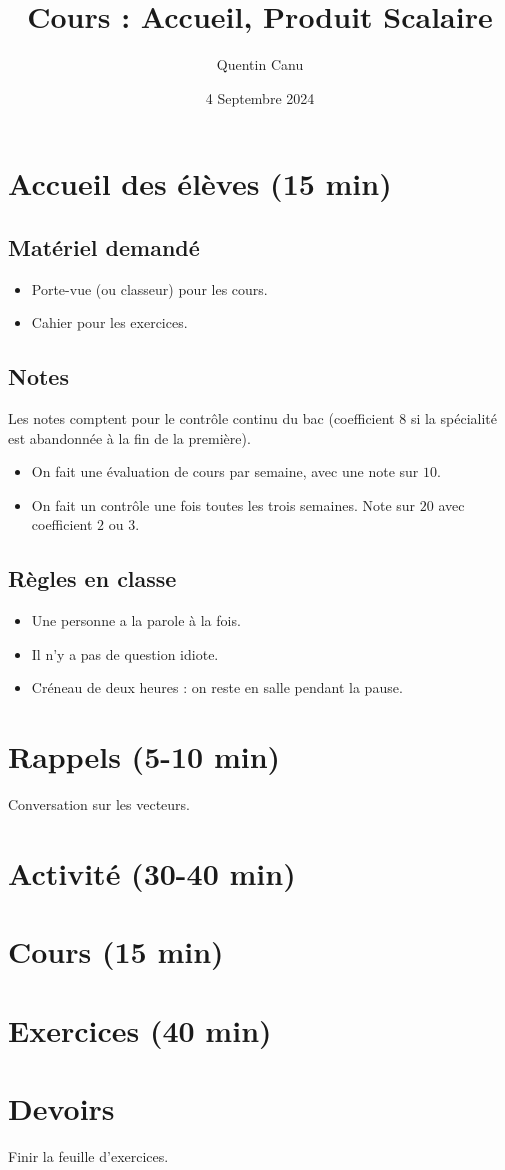 \documentclass{article}
\title{Cours : Accueil, Produit Scalaire}
\date{4 Septembre 2024}
\author{Quentin Canu}
\begin{document}
\maketitle

\section{Accueil des élèves (15 min)}
\subsection{Matériel demandé}
\begin{itemize}
\item Porte-vue (ou classeur) pour les cours.
\item Cahier pour les exercices. 
\end{itemize}
\subsection{Notes}
Les notes comptent pour le contrôle continu du bac (coefficient $8$ si la spécialité est abandonnée à la fin de la première).
\begin{itemize}
\item On fait une évaluation de cours par semaine, avec une note sur $10$.
\item On fait un contrôle une fois toutes les trois semaines. Note sur $20$ avec coefficient $2$ ou $3$.
\end{itemize}
\subsection{Règles en classe}
\begin{itemize}
\item Une personne a la parole à la fois.
\item Il n'y a pas de question idiote. 
\item Créneau de deux heures : on reste en salle pendant la pause.
\end{itemize}
\section{Rappels (5-10 min)}
Conversation sur les vecteurs.

\section{Activité (30-40 min)}
\section{Cours (15 min)}
\section{Exercices (40 min)}
\section{Devoirs}

Finir la feuille d'exercices.
\end{document}
